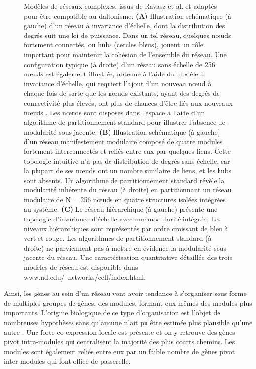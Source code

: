\begin{figure}[h!]
    \caption[Modèles de réseaux complexes, issus de Ravasz et al.]{Modèles de réseaux complexes, issus de Ravasz et al. \cite{Ravasz2002} et adaptés pour être compatible au daltonisme. \textbf{(A)} Illustration schématique (à gauche) d'un réseau à invariance d'échelle, dont la distribution des degrés suit une loi de puissance. Dans un tel réseau, quelques nœuds fortement connectés, ou hubs (cercles bleus), jouent un rôle important pour maintenir la cohésion de l'ensemble du réseau. Une configuration typique (à droite) d'un réseau sans échelle de 256 nœuds est également illustrée, obtenue à l'aide du modèle à invariance d'échelle, qui requiert l'ajout d'un nouveau nœud à chaque fois de sorte que les nœuds existants, ayant des degrés de connectivité plus élevés, ont plus de chances d'être liés aux nouveaux nœuds \cite{Barabasi1999Oct}. Les nœuds sont disposés dans l'espace à l'aide d'un algorithme de partitionnement standard \cite{Batagelj1998} pour illustrer l'absence de modularité sous-jacente. \textbf{(B)} Illustration schématique (à gauche) d'un réseau manifestement modulaire composé de quatre modules fortement interconnectés et reliés entre eux par quelques liens. Cette topologie intuitive n'a pas de distribution de degrés sans échelle, car la plupart de ses nœuds ont un nombre similaire de liens, et les hubs sont absents. Un algorithme de partitionnement standard révèle la modularité inhérente du réseau (à droite) en partitionnant un réseau modulaire de N = 256 nœuds en quatre structures isolées intégrées au système. \textbf{(C)} Le réseau hiérarchique (à gauche) présente une topologie d'invariance d'échelle avec une modularité intégrée. Les niveaux hiérarchiques sont représentés par ordre croissant de bleu à vert et rouge. Les algorithmes de partitionnement standard (à droite) ne parviennent pas à mettre en évidence la modularité sous-jacente du réseau. Une caractérisation quantitative détaillée des trois modèles de réseau est disponible dans www.nd.edu/~networks/cell/index.html\footnotemark.}
    \label{fig:ravasz_hierarchical_clustering}
\end{figure}

Ainsi, les gènes au sein d'un réseau vont avoir tendance à s'organiser sous forme de multiples groupes de gènes, des \glspl{module}, formant eux-mêmes des modules plus importants. L'origine biologique de ce type d'organisation est l'objet de nombreuses hypothèses sans qu'aucune n'ait pu être estimée plus plausible qu'une autre \cite{lin}. Une forte co-expression locale est présente et on y retrouve des gènes pivot intra-modules qui centralisent la majorité des plus courts chemins. Les modules sont également reliés entre eux par un faible nombre de gènes pivot inter-modules qui font office de passerelle.

